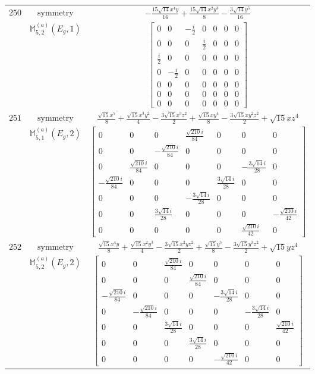 \documentclass[fleqn,8pt,landscape]{jsarticle}
\begin{document}
\begin{longtable}{ccc}
$ 250 $ & $ \text{symmetry} $ & $ - \frac{15 \sqrt{14} x^{4} y}{16} + \frac{15 \sqrt{14} x^{2} y^{3}}{8} - \frac{3 \sqrt{14} y^{5}}{16} $ \\
$  $ & $ \mathbb{M}_{5,2}^{(a)}(E_{g},1) $ & $ \begin{bmatrix} 0 & 0 & - \frac{i}{2} & 0 & 0 & 0 & 0 \\ 0 & 0 & 0 & \frac{i}{2} & 0 & 0 & 0 \\ \frac{i}{2} & 0 & 0 & 0 & 0 & 0 & 0 \\ 0 & - \frac{i}{2} & 0 & 0 & 0 & 0 & 0 \\ 0 & 0 & 0 & 0 & 0 & 0 & 0 \\ 0 & 0 & 0 & 0 & 0 & 0 & 0 \\ 0 & 0 & 0 & 0 & 0 & 0 & 0 \end{bmatrix} $ \\ \hline
$ 251 $ & $ \text{symmetry} $ & $ \frac{\sqrt{15} x^{5}}{8} + \frac{\sqrt{15} x^{3} y^{2}}{4} - \frac{3 \sqrt{15} x^{3} z^{2}}{2} + \frac{\sqrt{15} x y^{4}}{8} - \frac{3 \sqrt{15} x y^{2} z^{2}}{2} + \sqrt{15} x z^{4} $ \\
$  $ & $ \mathbb{M}_{5,1}^{(a)}(E_{g},2) $ & $ \begin{bmatrix} 0 & 0 & 0 & \frac{\sqrt{210} i}{84} & 0 & 0 & 0 \\ 0 & 0 & - \frac{\sqrt{210} i}{84} & 0 & 0 & 0 & 0 \\ 0 & \frac{\sqrt{210} i}{84} & 0 & 0 & 0 & - \frac{3 \sqrt{14} i}{28} & 0 \\ - \frac{\sqrt{210} i}{84} & 0 & 0 & 0 & \frac{3 \sqrt{14} i}{28} & 0 & 0 \\ 0 & 0 & 0 & - \frac{3 \sqrt{14} i}{28} & 0 & 0 & 0 \\ 0 & 0 & \frac{3 \sqrt{14} i}{28} & 0 & 0 & 0 & - \frac{\sqrt{210} i}{42} \\ 0 & 0 & 0 & 0 & 0 & \frac{\sqrt{210} i}{42} & 0 \end{bmatrix} $ \\ \hline
$ 252 $ & $ \text{symmetry} $ & $ \frac{\sqrt{15} x^{4} y}{8} + \frac{\sqrt{15} x^{2} y^{3}}{4} - \frac{3 \sqrt{15} x^{2} y z^{2}}{2} + \frac{\sqrt{15} y^{5}}{8} - \frac{3 \sqrt{15} y^{3} z^{2}}{2} + \sqrt{15} y z^{4} $ \\
$  $ & $ \mathbb{M}_{5,2}^{(a)}(E_{g},2) $ & $ \begin{bmatrix} 0 & 0 & \frac{\sqrt{210} i}{84} & 0 & 0 & 0 & 0 \\ 0 & 0 & 0 & \frac{\sqrt{210} i}{84} & 0 & 0 & 0 \\ - \frac{\sqrt{210} i}{84} & 0 & 0 & 0 & - \frac{3 \sqrt{14} i}{28} & 0 & 0 \\ 0 & - \frac{\sqrt{210} i}{84} & 0 & 0 & 0 & - \frac{3 \sqrt{14} i}{28} & 0 \\ 0 & 0 & \frac{3 \sqrt{14} i}{28} & 0 & 0 & 0 & \frac{\sqrt{210} i}{42} \\ 0 & 0 & 0 & \frac{3 \sqrt{14} i}{28} & 0 & 0 & 0 \\ 0 & 0 & 0 & 0 & - \frac{\sqrt{210} i}{42} & 0 & 0 \end{bmatrix} $ \\ \hline

\end{longtable}
\end{document}
